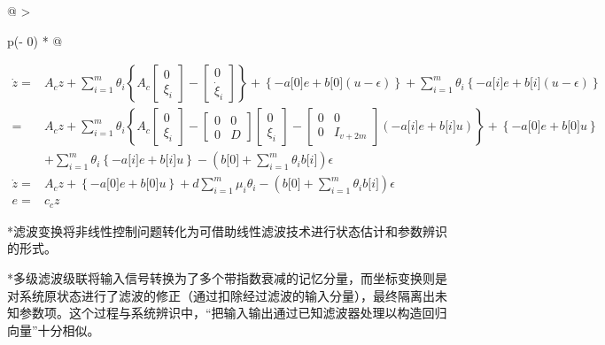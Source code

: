 \documentclass[
  12pt,
  a4paper
]{article}
\begin{document}
\begin{longtable}[]{@{}
  >{\raggedright\arraybackslash}p{}@{}}
\begin{minipage}[b]{\linewidth}
\[\begin{aligned}
\dot{z} = & A_{c}z + \sum_{i = 1}^{m}\theta_{i}\left\{ A_{c}\begin{bmatrix}
0 \\
\xi_{i}
\end{bmatrix} - \begin{bmatrix}
0 \\
{\dot{\xi}}_{i}
\end{bmatrix} \right\} + \left\{ - a\lbrack 0\rbrack e + b\lbrack 0\rbrack(u - \epsilon) \right\} + \sum_{i = 1}^{m}\theta_{i}\left\{ - a\lbrack i\rbrack e + b\lbrack i\rbrack(u - \epsilon) \right\} \\
 = & A_{c}z + \sum_{i = 1}^{m}\theta_{i}\left\{ A_{c}\begin{bmatrix}
0 \\
\xi_{i}
\end{bmatrix} - \begin{bmatrix}
0 & 0 \\
0 & D
\end{bmatrix}\begin{bmatrix}
0 \\
\xi_{i}
\end{bmatrix} - \begin{bmatrix}
0 & 0 \\
0 & I_{v + 2m}
\end{bmatrix}\left( - a\lbrack i\rbrack e + b\lbrack i\rbrack u \right) \right\} + \left\{ - a\lbrack 0\rbrack e + b\lbrack 0\rbrack u \right\} \\
 & + \sum_{i = 1}^{m}\theta_{i}\left\{ - a\lbrack i\rbrack e + b\lbrack i\rbrack u \right\} - \left( b\lbrack 0\rbrack + \sum_{i = 1}^{m}\theta_{i}b\lbrack i\rbrack \right)\epsilon \\
\dot{z} = & A_{c}z + \left\{ - a\lbrack 0\rbrack e + b\lbrack 0\rbrack u \right\} + d\sum_{i = 1}^{m}{\mu_{i}\theta_{i}} - \left( b\lbrack 0\rbrack + \sum_{i = 1}^{m}\theta_{i}b\lbrack i\rbrack \right)\epsilon \\
e = & c_{c}z
\end{aligned}\]

*滤波变换将非线性控制问题转化为可借助线性滤波技术进行状态估计和参数辨识的形式。

*多级滤波级联将输入信号转换为了多个带指数衰减的记忆分量，而坐标变换则是对系统原状态进行了滤波的修正（通过扣除经过滤波的输入分量），最终隔离出未知参数项。这个过程与系统辨识中，``把输入输出通过已知滤波器处理以构造回归向量''十分相似。
\end{minipage} \\
\midrule\noalign{}
\endhead
\bottomrule\noalign{}
\endlastfoot
\end{longtable}
\end{document}
